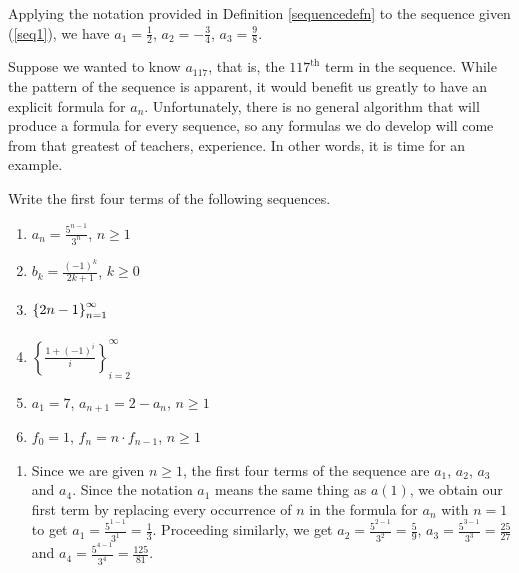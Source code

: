 \documentclass{ximera}
\begin{document}

 

Applying the notation provided in Definition \ref{sequencedefn} to the sequence given (\ref{seq1}), we have $a_1 =  \frac{1}{2}$, $a_2 =  -\frac{3}{4}$, $a_3 =  \frac{9}{8}$. 

Suppose we wanted to know $a_117$, that is, the $117^{\text{th}}$ term in the sequence. While the pattern of the sequence is apparent, it would benefit us greatly to have an explicit formula for $a_{n}$.  Unfortunately, there is no general algorithm that will produce a formula for every sequence, so any formulas we do  develop will come from that greatest of teachers, experience. In other words, it is time for an example.

\begin{example} \label{seqex1}  Write the first four terms of the following sequences.

\begin{enumerate}
\item  $a_{n} = \frac{5^{n-1}}{3^{n}}$, $n \geq 1$

\item  $b_{k} = \frac{(-1)^{k}}{2k+1}$, $k \geq 0$

\item  $\left\{ 2n - 1 \right\}_{n=1}^{\infty} \vphantom{\left\{\frac{1 + (-1)^{i}}{i} \right\}_{i=2}^{\infty}}$

\item  $\left\{\frac{1 + (-1)^{i}}{i} \right\}_{i=2}^{\infty}$

\item\label{introrecursiveex01}  $a_1 = 7$, $a_{n+1} = 2 - a_{n}$, $n \geq 1$

\item  \label{factorialintroex} $f_0 = 1$, $f_{n} =n \cdot f_{n-1}$, $n \geq 1$
\end{enumerate}

\begin{explanation}

\begin{enumerate}

\item Since we are given $n \geq 1$, the first four terms of the sequence are  $a_1$, $a_2$, $a_3$ and $a_4$.  Since the notation $a_1$ means the same thing as $a(1)$, we obtain our first term by replacing every occurrence of $n$ in the formula for $a_{n}$ with $n=1$ to get  $a_1 = \frac{5^{1-1}}{3^{1}} = \frac{1}{3}$.  Proceeding similarly, we get $a_2 = \frac{5^{2-1}}{3^{2}} =\frac{5}{9}$, $a_3 = \frac{5^{3-1}}{3^{3}} =\frac{25}{27}$ and $a_4 = \frac{5^{4-1}}{3^{4}} =\frac{125}{81}$.  


\end{enumerate}
\end{explanation}
\end{example}
\end{document}
